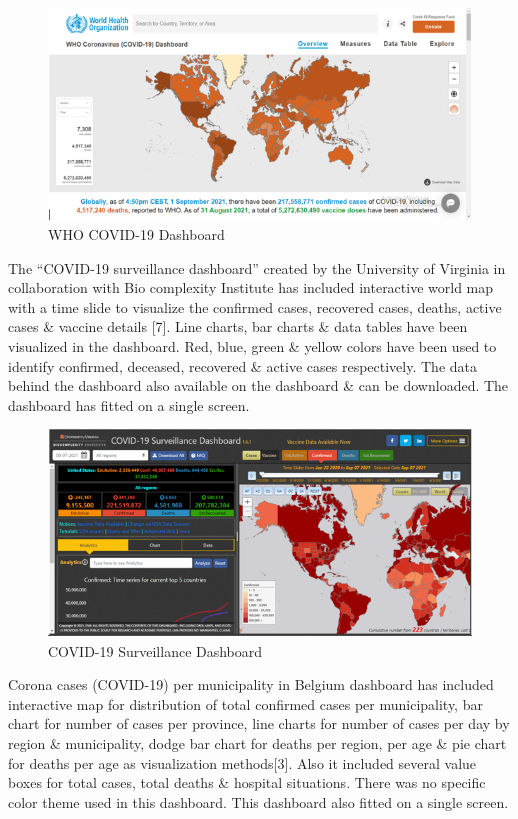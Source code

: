 \documentclass[
]{article}
\begin{document}
\begin{figure}
\includegraphics[width=8.35in]{Images/2} \caption{WHO COVID-19 Dashboard}\label{fig:unnamed-chunk-2}
\end{figure}

The ``COVID-19 surveillance dashboard'' created by the University of
Virginia in collaboration with Bio complexity Institute has included
interactive world map with a time slide to visualize the confirmed
cases, recovered cases, deaths, active cases \& vaccine details {[}7{]}.
Line charts, bar charts \& data tables have been visualized in the
dashboard. Red, blue, green \& yellow colors have been used to identify
confirmed, deceased, recovered \& active cases respectively. The data
behind the dashboard also available on the dashboard \& can be
downloaded. The dashboard has fitted on a single screen.

\begin{figure}
\includegraphics[width=8.42in]{Images/3} \caption{COVID-19 Surveillance Dashboard}\label{fig:unnamed-chunk-3}
\end{figure}

Corona cases (COVID-19) per municipality in Belgium dashboard has
included interactive map for distribution of total confirmed cases per
municipality, bar chart for number of cases per province, line charts
for number of cases per day by region \& municipality, dodge bar chart
for deaths per region, per age \& pie chart for deaths per age as
visualization methods{[}3{]}. Also it included several value boxes for
total cases, total deaths \& hospital situations. There was no specific
color theme used in this dashboard. This dashboard also fitted on a
single screen.
\end{document}
